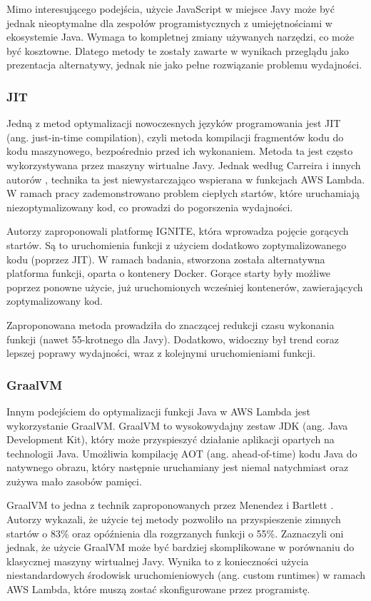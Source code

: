Mimo interesującego podejścia, użycie JavaScript w miejsce Javy może być jednak nieoptymalne dla zespołów programistycznych z umiejętnościami w ekosystemie Java. 
Wymaga to kompletnej zmiany używanych narzędzi, co może być kosztowne. Dlatego metody te zostały zawarte w wynikach przeglądu jako prezentacja alternatywy, jednak nie jako pełne rozwiązanie problemu wydajności.

\subsubsection*{JIT}

Jedną z metod optymalizacji nowoczesnych języków programowania jest JIT (ang. just-in-time compilation), czyli metoda kompilacji fragmentów kodu do kodu maszynowego, bezpośrednio przed ich wykonaniem.
Metoda ta jest często wykorzystywana przez maszyny wirtualne Javy. Jednak według Carreira i innych autorów \cite{10.1145/3458336.3465305}, technika ta jest niewystarczająco wspierana w funkcjach AWS Lambda.
W ramach pracy zademonstrowano problem ciepłych startów, które uruchamiają niezoptymalizowany kod, co prowadzi do pogorszenia wydajności.

Autorzy zaproponowali platformę IGNITE, która wprowadza pojęcie gorących startów. Są to uruchomienia funkcji z użyciem dodatkowo zoptymalizowanego kodu (poprzez JIT).
W ramach badania, stworzona została alternatywna platforma funkcji, oparta o kontenery Docker. 
Gorące starty były możliwe poprzez ponowne użycie, już uruchomionych wcześniej kontenerów, zawierających zoptymalizowany kod.

Zaproponowana metoda prowadziła do znaczącej redukcji czasu wykonania funkcji (nawet 55-krotnego dla Javy). 
Dodatkowo, widoczny był trend coraz lepszej poprawy wydajności, wraz z kolejnymi uruchomieniami funkcji.

\subsubsection*{GraalVM}

Innym podejściem do optymalizacji funkcji Java w AWS Lambda jest wykorzystanie GraalVM.
GraalVM to wysokowydajny zestaw JDK (ang. Java Development Kit), który może przyspieszyć działanie aplikacji opartych na technologii Java.
Umożliwia kompilację AOT (ang. ahead-of-time) kodu Java do natywnego obrazu, który następnie uruchamiany jest niemal natychmiast oraz zużywa mało zasobów pamięci.

GraalVM to jedna z technik zaproponowanych przez Menendez i Bartlett \cite{menéndez2023performancebestpracticesusing}.
Autorzy wykazali, że użycie tej metody pozwoliło na przyspieszenie zimnych startów o 83\% oraz opóźnienia dla rozgrzanych funkcji o 55\%.
Zaznaczyli oni jednak, że użycie GraalVM może być bardziej skomplikowane w porównaniu do klasycznej maszyny wirtualnej Javy. 
Wynika to z konieczności użycia niestandardowych środowisk uruchomieniowych (ang. custom runtimes) w ramach AWS Lambda, które muszą zostać skonfigurowane przez programistę.

